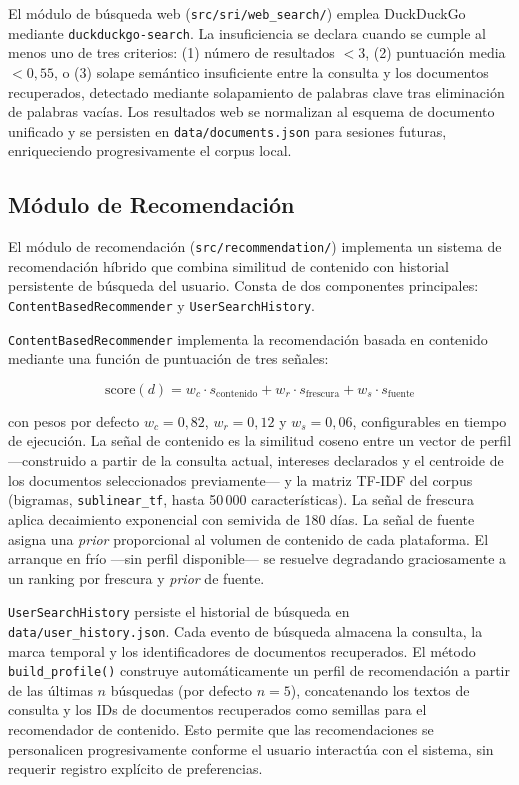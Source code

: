 \documentclass[runningheads,a4paper]{llncs}
\begin{document}
El módulo de búsqueda web (\texttt{src/sri/web\_search/}) emplea DuckDuckGo mediante \texttt{duckduckgo-search}. La insuficiencia se declara cuando se cumple al menos uno de tres criterios: (1) número de resultados $< 3$, (2) puntuación media $< 0{,}55$, o (3) solape semántico insuficiente entre la consulta y los documentos recuperados, detectado mediante solapamiento de palabras clave tras eliminación de palabras vacías. Los resultados web se normalizan al esquema de documento unificado y se persisten en \texttt{data/documents.json} para sesiones futuras, enriqueciendo progresivamente el corpus local.



\subsection{Módulo de Recomendación}

El módulo de recomendación (\texttt{src/recommendation/}) implementa un sistema de recomendación híbrido que combina similitud de contenido con historial persistente de búsqueda del usuario. Consta de dos componentes principales: \texttt{ContentBasedRecommender} y \texttt{UserSearchHistory}.

\texttt{ContentBasedRecommender} implementa la recomendación basada en contenido mediante una función de puntuación de tres señales:

$$\text{score}(d) = w_c \cdot s_\text{contenido} + w_r \cdot s_\text{frescura} + w_s \cdot s_\text{fuente}$$

con pesos por defecto $w_c = 0{,}82$, $w_r = 0{,}12$ y $w_s = 0{,}06$, configurables en tiempo de ejecución. La señal de contenido es la similitud coseno entre un vector de perfil —construido a partir de la consulta actual, intereses declarados y el centroide de los documentos seleccionados previamente— y la matriz TF-IDF del corpus (bigramas, \texttt{sublinear\_tf}, hasta 50\,000 características). La señal de frescura aplica decaimiento exponencial con semivida de 180 días. La señal de fuente asigna una \emph{prior} proporcional al volumen de contenido de cada plataforma. El arranque en frío —sin perfil disponible— se resuelve degradando graciosamente a un ranking por frescura y \emph{prior} de fuente.

\texttt{UserSearchHistory} persiste el historial de búsqueda en \texttt{data/user\_history.json}. Cada evento de búsqueda almacena la consulta, la marca temporal y los identificadores de documentos recuperados. El método \texttt{build\_profile()} construye automáticamente un perfil de recomendación a partir de las últimas $n$ búsquedas (por defecto $n=5$), concatenando los textos de consulta y los IDs de documentos recuperados como semillas para el recomendador de contenido. Esto permite que las recomendaciones se personalicen progresivamente conforme el usuario interactúa con el sistema, sin requerir registro explícito de preferencias.
\end{document}
